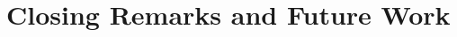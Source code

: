 \documentclass[reqno, 12pt, onesidie]{report}
\begin{document}
\cleardoublepage
  \chapter{Closing Remarks and Future Work}
  \label{chap:conc}
  




\cleardoublepage


 \begin{singlespace}
   \printbibliography
 \end{singlespace}

\end{document}
